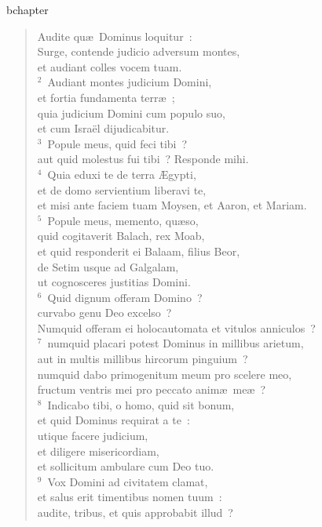 bchapter\begin{verse}\vspace{-19pt}Audite qu\ae\ Dominus loquitur~:\\ Surge, contende judicio adversum montes,\\ et audiant colles vocem tuam.\\
${}^{2}$~Audiant montes judicium Domini,\\ et fortia fundamenta terr\ae~;\\ quia judicium Domini cum populo suo,\\ et cum Isra\"el dijudicabitur.\\
${}^{3}$~Popule meus, quid feci tibi~?\\ aut quid molestus fui tibi~? Responde mihi.\\
${}^{4}$~Quia eduxi te de terra \AE gypti,\\ et de domo servientium liberavi te,\\ et misi ante faciem tuam Moysen, et Aaron, et Mariam.\\
${}^{5}$~Popule meus, memento, qu\ae so,\\ quid cogitaverit Balach, rex Moab,\\ et quid responderit ei Balaam, filius Beor,\\ de Setim usque ad Galgalam,\\ ut cognosceres justitias Domini.\\
${}^{6}$~Quid dignum offeram Domino~?\\ curvabo genu Deo excelso~?\\ Numquid offeram ei holocautomata et vitulos anniculos~?\\
${}^{7}$~numquid placari potest Dominus in millibus arietum,\\ aut in multis millibus hircorum pinguium~?\\ numquid dabo primogenitum meum pro scelere meo,\\ fructum ventris mei pro peccato anim\ae\ me\ae~?\\
${}^{8}$~Indicabo tibi, o homo, quid sit bonum,\\ et quid Dominus requirat a te~:\\ utique facere judicium,\\ et diligere misericordiam,\\ et sollicitum ambulare cum Deo tuo.\\
${}^{9}$~Vox Domini ad civitatem clamat,\\ et salus erit timentibus nomen tuum~:\\ audite, tribus, et quis approbabit illud~?\\

\end{verse}
